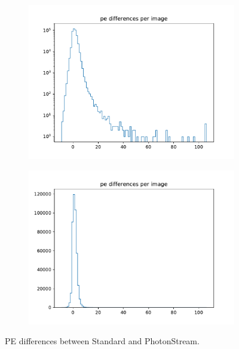 %
\begin{figure}
  \begin{subfigure}{0.5\textwidth}
    \includegraphics[width=1.1\textwidth]{Plots/diffs_hist_DBSCAN_pe_20131104_162_logy.pdf}
  \end{subfigure}
  \begin{subfigure}{0.5\textwidth}
    \includegraphics[width=1.1\textwidth]{Plots/diffs_hist_DBSCAN_pe_20131104_162.pdf}
  \end{subfigure}
  \caption{PE differences between Standard and PhotonStream.}
  \label{fig:pe_diffs}
\end{figure}


